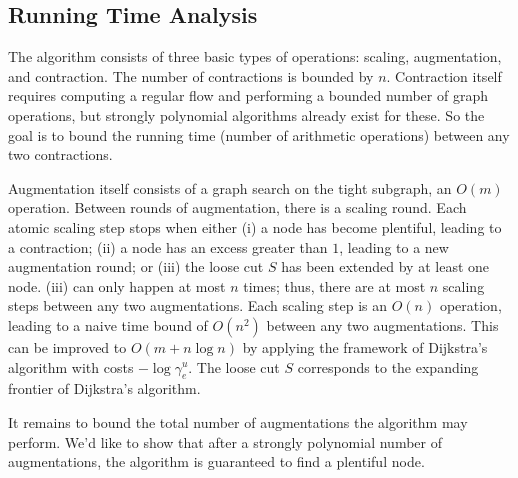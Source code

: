 \documentclass[11pt]{article}
\theoremstyle{definition}
\theoremstyle{definition}
\theoremstyle{definition}
\begin{document}
    \subsection{Running Time Analysis}
    The algorithm consists of three basic types of operations: scaling, augmentation, and contraction.
    The number of contractions is bounded by $n$. Contraction itself
    requires computing a regular flow and performing a bounded number of graph operations, but
    strongly polynomial algorithms already exist for these. So the goal is to bound the running time
    (number of arithmetic operations) between any two contractions.

    Augmentation itself consists of a graph search on the tight subgraph, an $O(m)$ operation.
    Between rounds of augmentation, there is a scaling round. Each atomic scaling step stops
    when either (i) a node has become plentiful, leading to a contraction; (ii) a node has an
    excess greater than $1$, leading to a new augmentation round; or (iii) the loose cut
    $S$ has been extended by at least one node. (iii) can only happen at most $n$ times; thus,
    there are at most $n$ scaling steps between any two augmentations. Each scaling step
    is an $O(n)$ operation, leading to a naive time bound of $O(n^2)$ between any two augmentations.
    This can be improved to $O(m + n \log n)$ by applying the framework of Dijkstra's
    algorithm with costs $-\log \gamma^u_e$. The loose cut $S$ corresponds to the expanding
    frontier of Dijkstra's algorithm.

    It remains to bound the total number of augmentations the algorithm may perform. We'd
    like to show that after a strongly polynomial number of augmentations, the algorithm
    is guaranteed to find a plentiful node.
\end{document}
